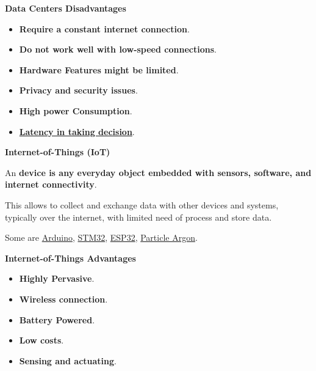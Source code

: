 \begin{flushleft}
    \textcolor{Red2}{ \textbf{Data Centers Disadvantages}}
\end{flushleft}
\begin{itemize}
    \item \textbf{Require a constant internet connection}.
    \item \textbf{Do not work well with low-speed connections}.
    \item \textbf{Hardware Features might be limited}.
    \item \textbf{Privacy and security issues}.
    \item \textbf{High power Consumption}.
    \item \textbf{\underline{Latency in taking decision}}.
\end{itemize}

\newpage

\begin{center}
    \large
    \textcolor{Red3}{\textbf{Internet-of-Things (IoT)}}
\end{center}

\noindent
An  \textbf{device is any everyday object embedded with sensors, software, and internet connectivity}.

\highspace
This allows to collect and exchange data with other devices and systems, typically over the internet, with limited need of process and store data.

\highspace
Some  are \href{https://www.arduino.cc/}{Arduino}, \href{https://www.st.com/en/microcontrollers-microprocessors/stm32-32-bit-arm-cortex-mcus.html}{STM32}, \href{https://en.wikipedia.org/wiki/ESP32}{ESP32}, \href{https://docs.particle.io/argon/}{Particle Argon}.

\begin{flushleft}
    \textcolor{Green3}{ \textbf{Internet-of-Things Advantages}}
\end{flushleft}
\begin{itemize}
    \item \textbf{Highly Pervasive}.
    \item \textbf{Wireless connection}.
    \item \textbf{Battery Powered}.
    \item \textbf{Low costs}.
    \item \textbf{Sensing and actuating}.
\end{itemize}

